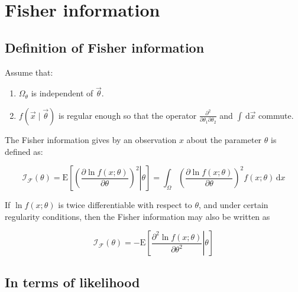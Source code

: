 

\section{Fisher information}
\label{sec:fisher_info}

\subsection{Definition of Fisher information}
\label{subsec:def_of_fisher_info}

Assume that:

\begin{enumerate}
	\item $\Omega_{\theta}$ is independent of $\vec{\theta}$.
	\item $f\left( \vec{x} \mid \vec{\theta} \right)$ is regular enough so that the operator $\frac{\partial^{2}}{\partial \theta_{1} \partial \theta_{2}}$ and $\int \,\mathrm{d}\vec{x}$ commute.
\end{enumerate}

The Fisher information gives by an observation $x$ about the parameter $\theta$ is defined as:

\begin{equation}\label{eq:def_of_fisher_info}
	\mathcal{I}_{\mathcal{F}}(\theta) 
	= \mathrm{E}\left[ \left. \left( 
	\frac{\partial \ln f(x ; \theta)}
		{\partial \theta} \right)^{2} 
	\right| \theta \right] 
	= \int _{\Omega} {\left( 
	\frac{\partial \ln f(x ; \theta)}
		{\partial \theta} \right)^{2} 
	f(x ; \theta)} \, \mathrm{d}x
\end{equation}

If $\ln f(x ; \theta)$ is twice differentiable with respect to $\theta$, and under certain regularity conditions, then the Fisher information may also be written as

\begin{equation}\label{eq:def_of_fisher_info_twice_differentiable}
	\mathcal{I}_{\mathcal{F}}(\theta) 
	= - \mathrm{E}\left[ \left. 
	\frac{\partial^{2} \ln f(x ; \theta)}
		{\partial \theta^{2}} 
	\right| \theta \right] 
\end{equation}

\subsection{In terms of likelihood}
\label{subsec:fisher_info_ll}

